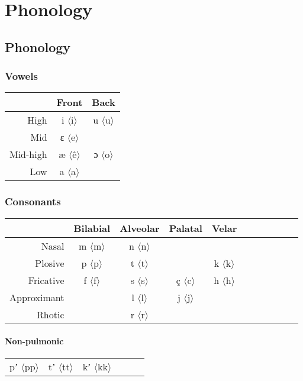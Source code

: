 \documentclass[a5paper,twoside]{book}
\title{\name}
\author{Einar Persson}
\newcommand{\Tstrut}{\rule{0pt}{2.6ex}}
\newcommand{\ipa}[1]{{\ipafont #1}}
\begin{document}
\frontmatter
\maketitle
\tableofcontents
\mainmatter

\part{Phonology}

\chapter{Phonology}

\section{Vowels}

\newcommand{\ipaort}[2]{\ipa{#1} $\langle$#2$\rangle$}

\begin{tabular}{r|c c}
    & Front & Back \\\hline
    High     & \ipaort{i}{i} & \ipaort{u}{u}\Tstrut\\
    Mid      & \ipaort{ɛ}{e} \\
    Mid-high & \ipaort{æ}{ê} & \ipaort{ɔ}{o} \\
    Low      & \ipaort{a}{a} \\
\end{tabular}

\section{Consonants}

\begin{tabular}{r|c c c c c c c c c c}
    & Bilabial & Alveolar & Palatal & Velar \\\hline
    Nasal & \ipaort{m}{m} & \ipaort{n}{n}\Tstrut\\
    Plosive & \ipaort{p}{p} & \ipaort{t}{t} && \ipaort{k}{k}  \\
    Fricative & \ipaort{f}{f} & \ipaort{s}{s} & \ipaort{ç}{c} & \ipaort{h}{h} \\
    Approximant && \ipaort{l}{l} & \ipaort{j}{j} \\
    Rhotic && \ipaort{r}{r}
\end{tabular}

\subsection*{Non-pulmonic}
\begin{tabular}{c c c c c c}
    \ipaort{pʼ}{pp} & \ipaort{tʼ}{tt} & \ipaort{kʼ}{kk}
\end{tabular}
\end{document}
